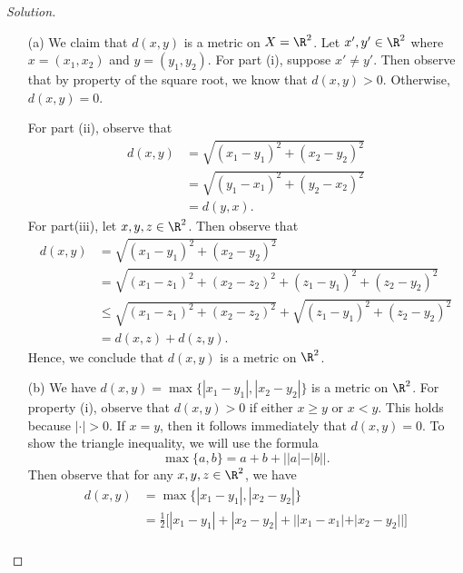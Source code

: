 \begin{proof}[Solution]
    \begin{enumerate}
        \item[(a)]  We claim that \( d(x,y)  \) is a metric on \( X = \R^{2} \). Let \( x', y' \in \R^{2} \) where \( x = (x_{1}, x_{2}) \) and \( y = (y_{1}, y_{2}) \). For part (i), suppose \( x' \neq y' \). Then observe that by property of the square root, we know that \( d(x,y) >  0  \). Otherwise, \( d(x,y) = 0  \). 

            For part (ii), observe that 
            \begin{align*}
                d(x,y) &= \sqrt{ (x_{1} - y_{1})^2 + (x_{2} - y_{2})^{2} }  \\
                       &= \sqrt{ (y_{1} - x_{1})^2 + (y_{2} - x_{2})^{2} } \\
                       &= d(y,x).
            \end{align*} 
        For part(iii), let \( x,y, z \in \R^2  \). Then observe that 
        \begin{align*}
            d(x,y) &= \sqrt{ (x_{1} - y_{1})^2 + (x_{2} - y_{2})^2  }  \\
                   &= \sqrt{ (x_{1} - z_{1})^2 + (x_{2} - z_{2})^{2} + (z_{1} - y_{1})^{2} + (z_{2} - y_{2})^{2}  } \\ 
                   &\leq \sqrt{ (x_{1} - z_{1})^2 + (x_{2}  - z_{2})^2   }  + \sqrt{ (z_{1} - y_{1})^2 + (z_{2} - y_{2})^{2} } \\
                   &= d(x,z) + d(z,y).
        \end{align*}
        Hence, we conclude that \( d(x,y)  \) is a metric on \( \R^{2}  \).
    \item[(b)] We have \( d(x,y) = \max \{ | x_{1} - y_{1}  |, | x_{2} - y_{2} |  \}  \) is a metric on \( \R^2  \). 
        For property (i), observe that \( d(x,y) > 0  \) if either \( x \geq y  \) or \( x < y  \). This holds because \( |  \cdot | > 0  \). If \( x = y  \), then it follows immediately that \( d(x,y) = 0   \). To show the triangle inequality, we will use the formula 
        \[ \max \{ a,b \}  = a + b + | | a | - | b |  |.  \]
        Then observe that for any \( x,y,z \in \R^2 \), we have 
        \begin{align*}
            d(x,y) &= \max \{ | x_{1} - y_{1} | , | x_{2} - y_{2} |  \}  \\
                   &= \frac{ 1 }{ 2 } \Big[ | x_{1} - y_{1} |  + | x_{2} - y_{2} |  + | | x_{1} -  x_{1}  | + | x_{2} - y_{2} |   |  \Big] \\

\end{align*}
\end{enumerate}
\end{proof}
